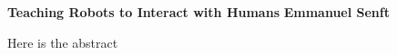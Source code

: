 \textbf{Teaching Robots to Interact with Humans}\newline
\textbf{Emmanuel Senft}

Here is the abstract
